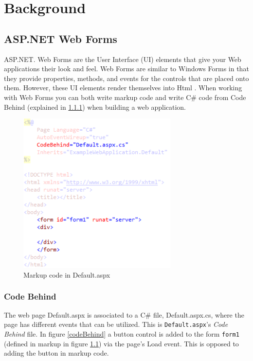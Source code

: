 \chapter{Background}

\section{ASP.NET Web Forms} %
\label{sec:asp_net_web_forms}
	ASP.NET. Web Forms are the User Interface (UI) elements that give your Web applications their look and feel. Web Forms are similar to Windows Forms \cite{msdn01} in that they provide properties, methods, and events for the controls that are placed onto them. However, these UI elements render themselves into Html \cite{msdn02}. When working with Web Forms you can both write markup code and write C\# code from Code Behind (explained in \ref{sub:code_behind}) when building a web application. 

	\begin{figure}[H]
					\includegraphics[width=8cm]{resources/images/Markup.png}
				\caption{Markup code in Default.aspx}
				\label{markup}
			\end{figure}

	\subsection{Code Behind} %
	\label{sub:code_behind}
		The web page Default.aspx is associated to a C\# file, Default.aspx.cs, where the page has different events that can be utilized. This is \texttt{Default.aspx}'s \emph{Code Behind} file. In figure \ref{codeBehind} a button control is added to the form \texttt{form1} (defined in markup in figure \ref{markup}) via the page’s Load event. This is opposed to adding the button in markup code.


